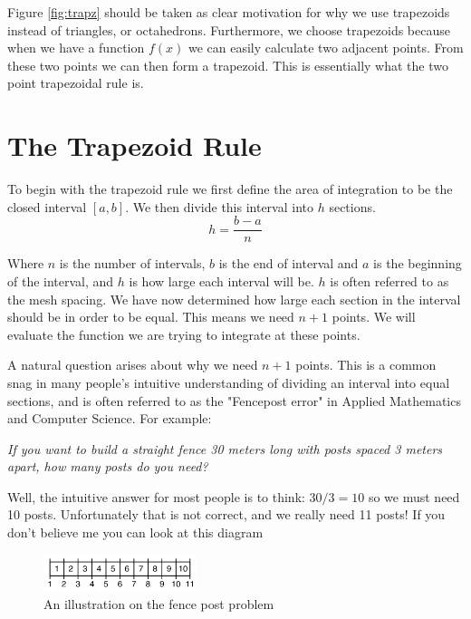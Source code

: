 \documentclass[10pt, reqno]{article}
\numberwithin{equation}{section}
\numberwithin{figure}{section}
\begin{document}
\noindent Figure \ref{fig:trapz} should be taken as clear motivation for why we use trapezoids instead of triangles, or octahedrons. 
Furthermore, we choose trapezoids because when we have a function $f(x)$ we can easily calculate two adjacent points. From these two points we can then form a trapezoid. This is essentially what the two point trapezoidal rule is.  

\section{The Trapezoid Rule}

To begin with the trapezoid rule we first define the area of integration to be the closed interval $[a,b]$. We then divide this interval into $h$ sections. 
\begin{equation}
\label{eq:meshspacing}
h = \frac{b-a}{n}
\end{equation}

\noindent Where $n$ is the number of intervals, $b$ is the end of interval and $a$ is the beginning of the interval, and $h$ is how large each interval will be. $h$ is often referred to as the mesh spacing. We have now determined how large each section in the interval should be in order to be equal. This means we need  $n + 1$ points. We will evaluate the function we are trying to integrate at these points.

A natural question arises about why we need $n+1$ points. This is a common snag in many people's intuitive understanding of dividing an interval into equal sections, and is often referred to as the "Fencepost error" in Applied Mathematics and Computer Science. For example: 

\medskip

\noindent \textit{If you want to build a straight fence 30 meters long with posts spaced 3 meters apart, how many posts do you need?}     

\medskip

\noindent Well, the intuitive answer for most people is to think: $30/3 = 10$ so we must need 10 posts. Unfortunately that is not correct, and we really need 11 posts! If you don't believe me you can look at this diagram

\begin{figure}[ht!] %
\centering
\includegraphics[width=0.4\textwidth]{Fencepost.png}
\caption{An illustration on the fence post problem \cite{ref:fencepost}}
\label{fig:fencepost}
\end{figure}
\end{document}

